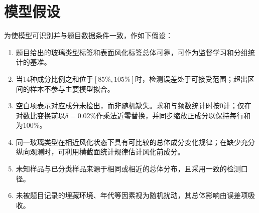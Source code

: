 \section{模型假设}

为使模型可识别并与题目数据条件一致，作如下假设：
\begin{enumerate}
  \item 题目给出的玻璃类型标签和表面风化标签总体可靠，可作为监督学习和分组统计的基准。
  \item 当14种成分比例之和位于\([85\%,105\%]\)时，检测误差处于可接受范围；超出区间的样本不参与主要模型拟合。
  \item 空白项表示对应成分未检出，而非随机缺失。求和与频数统计时按0计；仅在对数比变换前以\(\delta=0.02\%\)作乘法近零替换，并同步缩放正成分以保持每行和为\(100\%\)。
  \item 同一玻璃类型在相近风化状态下具有可比较的总体成分变化规律；在缺少充分纵向观测时，可利用横截面统计规律估计风化前成分。
  \item 未知样品与已分类样品来源于相同或相近的总体分布，且采用一致的检测口径。
  \item 未被题目记录的埋藏环境、年代等因素视为随机扰动，其总体影响由误差项吸收。
\end{enumerate}
